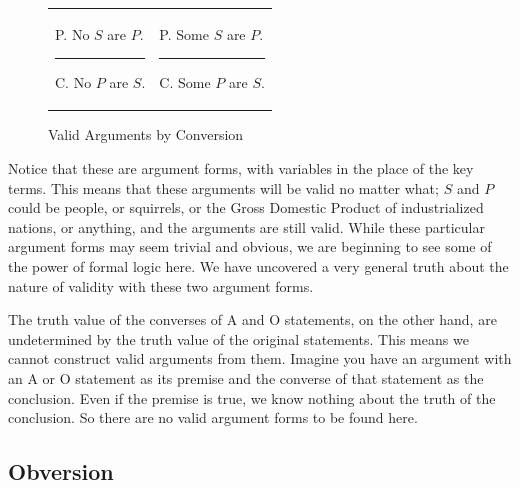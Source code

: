 \begin{figure}
\begin{mdframed}[style=mytablebox]
\begin{tabu}{p{.5\linewidth}p{.5\linewidth}}

\begin{earg}
\item[P.] No $S$ are $P$.
\vspace{-.5em}
\item [] \rule{0.6\linewidth}{1pt} 
\item[C.] No $P$ are $S$.
\end{earg} 

&

\begin{earg}
\item[P.] Some $S$ are $P$.
\vspace{-.5em}
\item [] \rule{0.6\linewidth}{1pt} 
\item[C.] Some  $P$ are $S$.
\end{earg} 
\end{tabu}
\end{mdframed}
\caption{Valid Arguments by Conversion} \label{fig:conversion_arguments}
\end{figure}

Notice that these are argument forms, with variables in the place of the key terms. This means that these arguments will be valid no matter what; $S$ and $P$ could be people, or squirrels, or the Gross Domestic Product of industrialized nations, or anything, and the arguments are still valid. While these particular argument forms may seem trivial and obvious, we are beginning to see some of the power of formal logic here. We have uncovered a very general truth about the nature of validity with these two argument forms. 

The truth value of the converses of A and O statements, on the other hand, are undetermined by the truth value of the original statements. This means we cannot construct valid arguments from them. Imagine you have an argument with an A or O statement as its premise and the converse of that statement as the conclusion. Even if the premise is true, we know nothing about the truth of the conclusion. So there are no valid argument forms to be found here. 

\subsection{Obversion}


